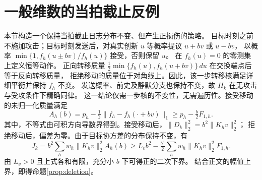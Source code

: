 \section{一般维数的当拍截止反例}
\label{app:mh}
本节构造一个保持当拍截止日志分布不变、但产生正损伤的策略。
目标时刻之前不施加攻击；目标时刻发送后，对真实创新 $u$ 等概率提议 $u+bv$ 或 $u-bv$，
以概率 $\min\{1,f_h(u\pm bv)/f_h(u)\}$ 接受，否则保留 $u$。
在 $f_h(u)=0$ 的零测集上定义恒等动作。
正向转移质量 $\frac12\min\{f_h(u),f_h(u+bv)\}\,du$ 在交换端点后等于反向转移质量，
拒绝移动的质量位于对角线上。因此，该一步转移核满足详细平衡并保持 $f_h$ 不变。
发送概率、前史及静默分支也保持不变，故 $H_k$ 在无攻击与受攻条件下精确同律。
这一结论仅需一步核的不变性，无需遍历性。接受移动的未归一化质量满足
\begin{equation}
 A_h(b)=p_h-\tfrac12\|f_h-f_h(\cdot+bv)\|_1
 \ge p_h-\tfrac b2F_{1,h}.
\end{equation}
其中，不等式由可积方向导数界得到。接受移动后，$\|D_k\|_2^2=b^2\|K_hv\|_2^2$；
拒绝移动后，偏差为零。由于目标协方差的分布保持不变，有
\begin{equation}
 J_k=b^2\sum_hw_h\|K_hv\|_2^2A_h(b)
 \ge L_vb^2-\tfrac{b^3}{2}\sum_hw_h\|K_hv\|_2^2F_{1,h}.
\end{equation}
由 $L_v>0$ 且上式各和有限，充分小 $b$ 下可得正的二次下界。
结合正文的幅值上界，即得命题\ref{prop:deletion}。
